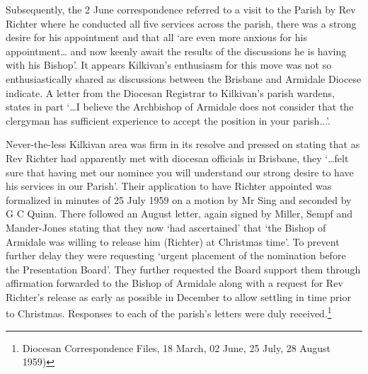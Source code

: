 Subsequently, the 2 June correspondence referred to a visit to the Parish by Rev Richter where he conducted all five services across the parish, there was a strong desire for his appointment and that all `are even more anxious for his appointment\ldots{} and now keenly await the results of the discussions he is having with his Bishop'. It appears Kilkivan's enthusiasm for this move was not so enthusiastically shared as discussions between the Brisbane and Armidale Diocese indicate. A letter from the Diocesan Registrar to Kilkivan's parish wardens, states in part `\ldots I believe the Archbishop of Armidale does not consider that the clergyman has sufficient experience to accept the position in your parish...'.



Never-the-less Kilkivan area was firm in its resolve and pressed on stating that as Rev Richter had apparently met with diocesan officials in Brisbane, they `\ldots felt sure that having met our nominee you will understand our strong desire to have his services in our Parish'. Their application to have Richter appointed was formalized in minutes of 25 July 1959 on a motion by Mr Sing and seconded by G C Quinn. There followed an August letter, again signed by Miller, Sempf and Mander-Jones stating that they now `had ascertained' that `the Bishop of Armidale was willing to release him (Richter) at Christmas time'. To prevent further delay they were requesting `urgent placement of the nomination before the Presentation Board'. They further requested the Board support them through affirmation forwarded to the Bishop of Armidale along with a request for Rev Richter's release as early as possible in December to allow settling in time prior to Christmas. Responses to each of the parish's letters were duly received.\footnote{Diocesan Correspondence Files, 18 March, 02 June, 25 July, 28 August 1959)}








